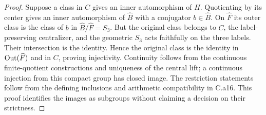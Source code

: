 \begin{proof}
Suppose a class in $C$ gives an inner automorphism of $H$. Quotienting
by its center gives an inner automorphism of $\widehat B$ with a
conjugator $b\in\widehat B$. On $\widehat F$ its outer class is
the class of $b$ in $\widehat B/\widehat F=S_3$. But the original
class belongs to $C$, the label-preserving centralizer, and the
geometric $S_3$ acts faithfully on the three labels. Their intersection
is the identity. Hence the original class is the identity in
$\operatorname{Out}(\widehat F)$ and in $C$, proving injectivity. Continuity follows
from the continuous finite-quotient constructions and uniqueness of the
central lift; a continuous injection from this compact group has closed
image. The restriction statements follow from the defining inclusions
and arithmetic compatibility in C.a16. This proof identifies the
images as subgroups without claiming a decision on their strictness.
\end{proof}
